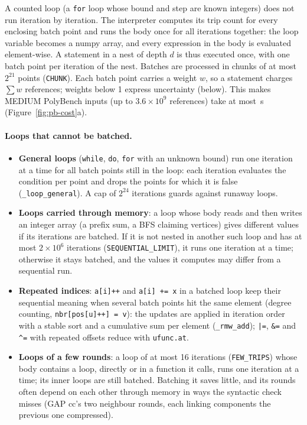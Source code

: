 \documentclass[11pt]{article}
\newcommand{\code}[1]{\texttt{#1}}
\newcommand{\figref}[1]{Figure~\ref{#1}}
\begin{document}
A counted loop (a \code{for} loop whose bound and step are known integers) does not run iteration by iteration. The
interpreter computes its trip count for every enclosing batch point and runs the body once for all iterations
together: the loop variable becomes a numpy array, and every expression in the body is evaluated element-wise. A
statement in a nest of depth $d$ is thus executed once, with one batch point per iteration of the nest. Batches are
processed in chunks of at most $2^{21}$ points (\code{CHUNK}). Each batch point carries a weight $w$, so a statement
charges $\sum w$ references; weights below 1 express uncertainty (below). This makes MEDIUM PolyBench inputs
(up to $3.6 \times 10^9$ references) take at most \numinterpMaxSeconds\,s (\figref{fig:pb-cost}a).

\paragraph{Loops that cannot be batched.}
\begin{itemize}
\item \textbf{General loops} (\code{while}, \code{do}, \code{for} with an unknown bound) run one iteration at a
time for all batch points still in the loop: each iteration evaluates the condition per point and drops the points
for which it is false (\code{\_loop\_general}). A cap of $2^{24}$ iterations guards against runaway loops.
\item \textbf{Loops carried through memory}: a loop whose body reads and then writes an integer array (a prefix
sum, a BFS claiming vertices) gives different values if its iterations are batched. If it is not nested in another
such loop and has at most $2\times 10^6$ iterations (\code{SEQUENTIAL\_LIMIT}), it runs one iteration at a time;
otherwise it stays batched, and the values it computes may differ from a sequential run.
\item \textbf{Repeated indices}: \code{a[i]++} and \code{a[i] += x} in a batched loop keep their sequential meaning
when several batch points hit the same element (degree counting, \code{nbr[pos[u]++] = v}): the updates are
applied in iteration order with a stable sort and a cumulative sum per element (\code{\_rmw\_add}); \code{|=},
\code{\&=} and \code{\^{}=} with repeated offsets reduce with \code{ufunc.at}.
\item \textbf{Loops of a few rounds}: a loop of at most 16 iterations (\code{FEW\_TRIPS}) whose body contains a loop,
directly or in a function it calls, runs one iteration at a time; its inner loops are still batched. Batching it
saves little, and its rounds often depend on each other through memory in ways the syntactic check misses (GAP cc's
two neighbour rounds, each linking components the previous one compressed).
\end{itemize}
\end{document}
